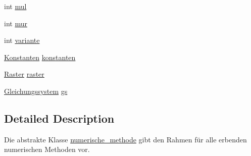 \begin{DoxyCompactItemize}
\item 
int \hyperlink{classnumerische__methode_a20e0d47e90b9a0f9a83aab2b225a4616}{mul}
\item 
int \hyperlink{classnumerische__methode_a36f2c35ed9b3448c6bb8656e057ae44a}{mur}
\item 
int \hyperlink{classnumerische__methode_a98b4b3256bbcd2306acbe4d69f5258f7}{variante}
\item 
\hyperlink{classKonstanten}{Konstanten} \hyperlink{classnumerische__methode_a54c65c639dc4ea722d6f84ed6ff4c75b}{konstanten}
\item 
\hyperlink{classRaster}{Raster} \hyperlink{classnumerische__methode_ad68a4b94b3246043db399adf04959ab6}{raster}
\item 
\hyperlink{classGleichungssystem}{Gleichungssystem} \hyperlink{classnumerische__methode_ae9920302fb4e0fae9f055c0dcdff8b5a}{gs}
\end{DoxyCompactItemize}


\subsection{Detailed Description}
Die abstrakte Klasse \hyperlink{classnumerische__methode}{numerische\-\_\-methode} gibt den Rahmen für alle erbenden numerischen Methoden vor. 

